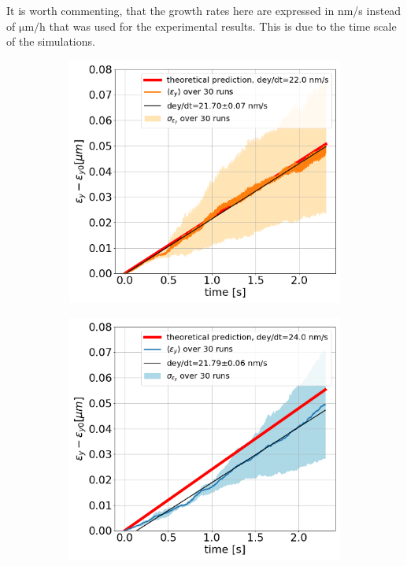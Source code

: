 It is worth commenting, that the growth rates here are expressed in nm/s instead of $\mathrm{\mu m/h}$ that was used for the experimental results. This is due to the time scale of the simulations.
\begin{figure}[htp]
    \centering
    \begin{subfigure}{.45\textwidth}
        \centering
        \includegraphics[width=.95\linewidth]{images/Ch6/pyheadtail_benchmark_amplitude_noise.png}  
    \end{subfigure}
    \begin{subfigure}{.45\textwidth}
        \centering
        \includegraphics[width=.95\linewidth]{images/Ch6/pyheadtail_benchmark_phase_noise.png}

\end{subfigure}
\end{figure}
